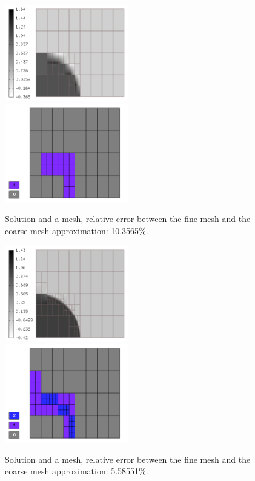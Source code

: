 \begin{figure}[H]
\begin{center}
\includegraphics[width=0.48\textwidth]{minor_examples/Sln2.png}\ \ \ 
\includegraphics[width=0.48\textwidth]{minor_examples/Space2.png}
\end{center}
\vspace{-4mm}
\caption{Solution and a mesh, relative error between the fine mesh and the coarse mesh approximation: 10.3565\%.}
\end{figure}

\begin{figure}[H]
\begin{center}
\includegraphics[width=0.48\textwidth]{minor_examples/Sln3.png}\ \ \ 
\includegraphics[width=0.48\textwidth]{minor_examples/Space3.png}
\end{center}
\vspace{-4mm}
\caption{Solution and a mesh, relative error between the fine mesh and the coarse mesh approximation: 5.58551\%.}
\end{figure}

